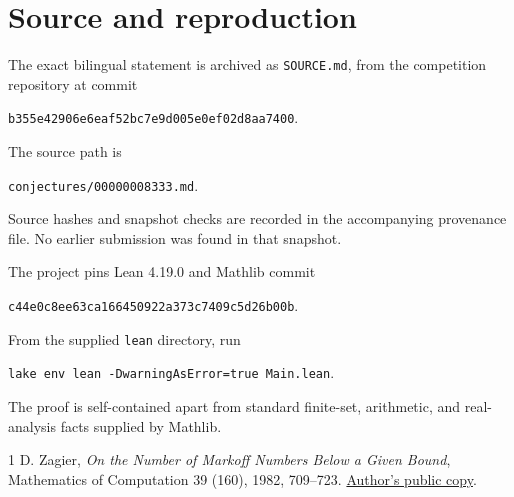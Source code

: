 \documentclass[11pt]{article}
\begin{document}
\section*{Source and reproduction}
The exact bilingual statement is archived as \texttt{SOURCE.md},
from the competition repository at commit
\begin{center}\texttt{b355e42906e6eaf52bc7e9d005e0ef02d8aa7400}.\end{center}
The source path is
\begin{center}\texttt{conjectures/00000008333.md}.\end{center}
Source hashes and snapshot checks are recorded in the accompanying
provenance file. No earlier submission was found in that snapshot.

The project pins Lean 4.19.0 and Mathlib commit
\begin{center}\texttt{c44e0c8ee63ca166450922a373c7409c5d26b00b}.\end{center}
From the supplied \texttt{lean} directory, run
\begin{center}\texttt{lake env lean -DwarningAsError=true Main.lean}.\end{center}
The proof is self-contained apart from standard finite-set,
arithmetic, and real-analysis facts supplied by Mathlib.
\begin{thebibliography}{1}
 D. Zagier, \emph{On the Number of Markoff Numbers
Below a Given Bound}, Mathematics of Computation 39 (160), 1982,
709--723.
\href{https://people.mpim-bonn.mpg.de/zagier/files/doi/10.2307/2007348/fulltext.pdf}{Author's public copy}.
\end{thebibliography}
\end{document}
